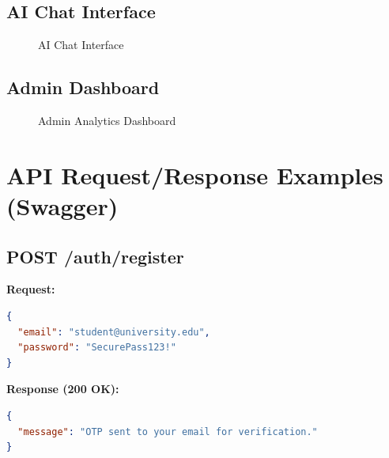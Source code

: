 \documentclass[12pt,a4paper]{report}
\begin{document}
\subsection{AI Chat Interface}

\begin{figure}[H]
\centering
{}
\caption{AI Chat Interface}
\end{figure}

\subsection{Admin Dashboard}

\begin{figure}[H]
\centering
{}
\caption{Admin Analytics Dashboard}
\end{figure}

\section{API Request/Response Examples (Swagger)}

\subsection{POST /auth/register}

\textbf{Request:}
\begin{lstlisting}[language=json]
{
  "email": "student@university.edu",
  "password": "SecurePass123!"
}
\end{lstlisting}

\textbf{Response (200 OK):}
\begin{lstlisting}[language=json]
{
  "message": "OTP sent to your email for verification."
}
\end{lstlisting}
\end{document}
